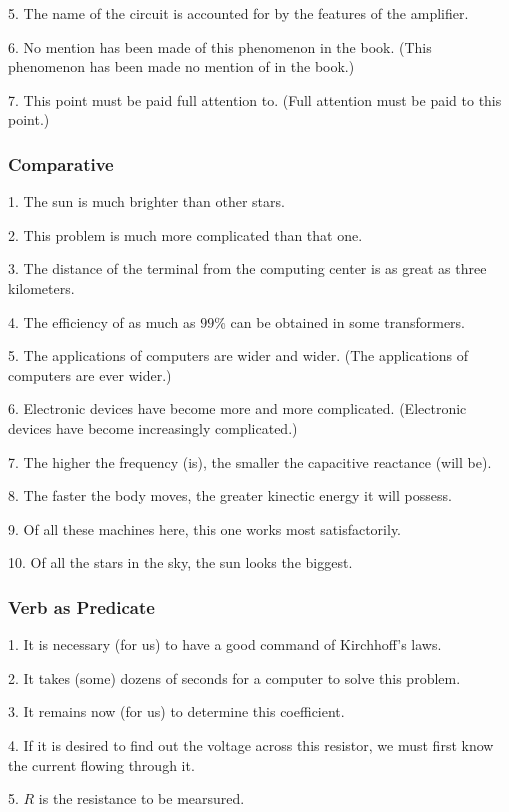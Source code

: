 \documentclass[a4paper,twocolumn,10pt]{article}
\begin{document}
\begin{CJK}{UTF8}{gkai}
	5. The name of the circuit is accounted for by the features of the amplifier.

	6. No mention has been made of this phenomenon in the book. (This phenomenon has been
	made no mention of in the book.)

	7. This point must be paid full attention to. (Full attention  must be paid to this point.)

	\subsubsection{Comparative}

	1. The sun is much brighter than other stars.

	2. This problem is much more complicated than that one.

	3. The distance of the terminal from the computing center is as great as three kilometers.

	4. The efficiency of as much as $99\%$ can be obtained in some transformers.

	5. The applications of computers are wider and wider. (The applications of computers are ever wider.)

	6. Electronic devices have become more and more complicated. (Electronic devices have become increasingly complicated.)

	7. The higher the frequency (is), the smaller the capacitive reactance (will be).

	8. The faster the body moves, the greater kinectic energy it will possess.

	9. Of all these machines here, this one works most satisfactorily.

	10. Of all the stars in the sky, the sun looks the biggest.

	\subsubsection{Verb as Predicate}

	1. It is necessary (for us) to have a good command of Kirchhoff's laws.

	2. It takes (some) dozens of seconds for a computer to solve this problem.

	3. It remains now (for us) to determine this coefficient.

	4. If it is desired to find out the voltage across this resistor, we must
	first know the current flowing through it.

	5. $R$ is the resistance to be mearsured.


\end{CJK}
\end{document}
